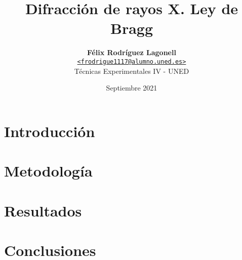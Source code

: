 \documentclass[a4paper, twocolumn]{article}
\title{\vspace{-1.5em}\textbf{Difracción de rayos X. Ley de Bragg}}
\author{{\textbf{Félix Rodríguez Lagonell}} \\
        {\href{mailto:erija578@student.liu.se}
        {\texttt{<frodrigue1117@alumno.uned.es>}}} \\
        {Técnicas Experimentales IV - UNED}}
\date{Septiembre 2021}
\begin{document}
    \maketitle

    \begin{abstract}  \end{abstract} %
    \section{Introducción} \label{sec:introduction} 
    \section{Metodología} \label{sec:related_work} 
    \section{Resultados} \label{sec:results} 
    \section{Conclusiones} \label{sec:conclusions} 

    \nocite{*} %
    
    
    \appendix

    
\end{document}
